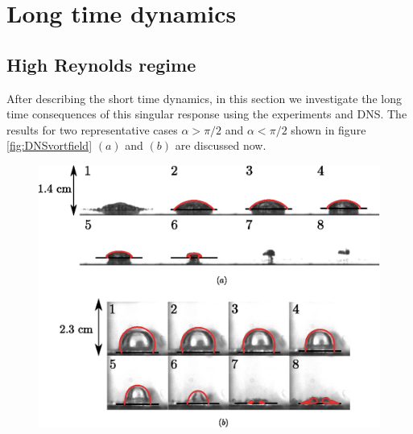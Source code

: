 \documentclass[final]{jfm}
\begin{document}
\section{Long time dynamics}\label{sec:jetting}

\subsection{High Reynolds regime}
After describing the short time dynamics, in this section we investigate the long time consequences of this singular response using the experiments and DNS. The results for two representative cases $\alpha > \pi/2$ and $\alpha < \pi/2$ shown in figure \ref{fig:DNSvortfield} $(a)$ and $(b)$ are discussed now.\\


\begin{figure}
  \centering
    \includegraphics[scale = 0.8]{figsv2/Fig7.eps}

\end{figure}
\end{document}
